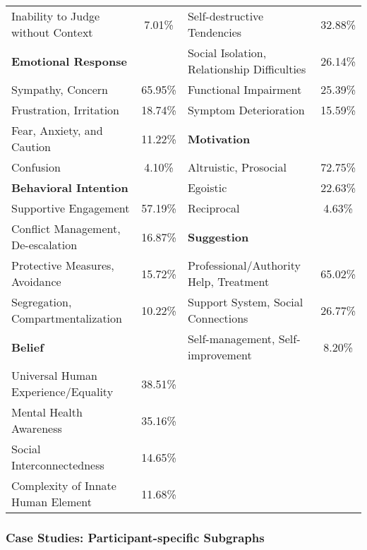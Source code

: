\begin{table*}[htbp]
\begin{tabular}{p{16.70em}clc}
\cmidrule{3-4}    Inability to Judge without Context & 7.01\% & \multicolumn{1}{p{16.70em}}{Self-destructive Tendencies} & 32.88\% \\
\cmidrule{1-2}    \multicolumn{2}{p{16.70em}}{\textbf{Emotional Response}} & \multicolumn{1}{p{16.70em}}{Social Isolation, Relationship Difficulties} & 26.14\% \\
\cmidrule{1-2}    Sympathy, Concern & 65.95\% & \multicolumn{1}{p{16.70em}}{Functional Impairment} & 25.39\% \\[3.9pt]
    Frustration, Irritation & 18.74\% & \multicolumn{1}{p{16.70em}}{Symptom Deterioration} & 15.59\% \\
\cmidrule{3-4}    Fear, Anxiety, and Caution & 11.22\% & \multicolumn{2}{p{16.70em}}{\textbf{Motivation}} \\
\cmidrule{3-4}    Confusion & 4.10\% & \multicolumn{1}{p{16.70em}}{Altruistic, Prosocial} & 72.75\% \\
\cmidrule{1-2}    \multicolumn{2}{p{16.70em}}{\textbf{Behavioral Intention}} & \multicolumn{1}{p{16.70em}}{Egoistic} & 22.63\% \\
\cmidrule{1-2}    Supportive Engagement & 57.19\% & \multicolumn{1}{p{16.70em}}{Reciprocal} & 4.63\% \\
\cmidrule{3-4}    Conflict Management, De-escalation & 16.87\% & \multicolumn{2}{p{16.70em}}{\textbf{Suggestion}} \\
\cmidrule{3-4}    Protective Measures, Avoidance & 15.72\% & \multicolumn{1}{p{16.70em}}{Professional/Authority Help, Treatment} & 65.02\% \\[3.9pt]
    Segregation, Compartmentalization & 10.22\% & \multicolumn{1}{p{16.70em}}{Support System, Social Connections} & 26.77\% \\
\cmidrule{1-2}    \multicolumn{2}{p{16.70em}}{\textbf{Belief}} & \multicolumn{1}{p{16.70em}}{Self-management, Self-improvement} & 8.20\% \\
    \midrule
    Universal Human Experience/Equality & 38.51\% &       &  \\[3.9pt]
    Mental Health Awareness & 35.16\% &       &  \\[3.9pt]
    Social Interconnectedness & 14.65\% &       &  \\[3.9pt]
    Complexity of Innate Human Element & 11.68\% &       &  \\
    \bottomrule
    \end{tabular}%
  \label{tab:theme}%
\end{table*}%


\subsubsection{Case Studies: Participant-specific Subgraphs}

